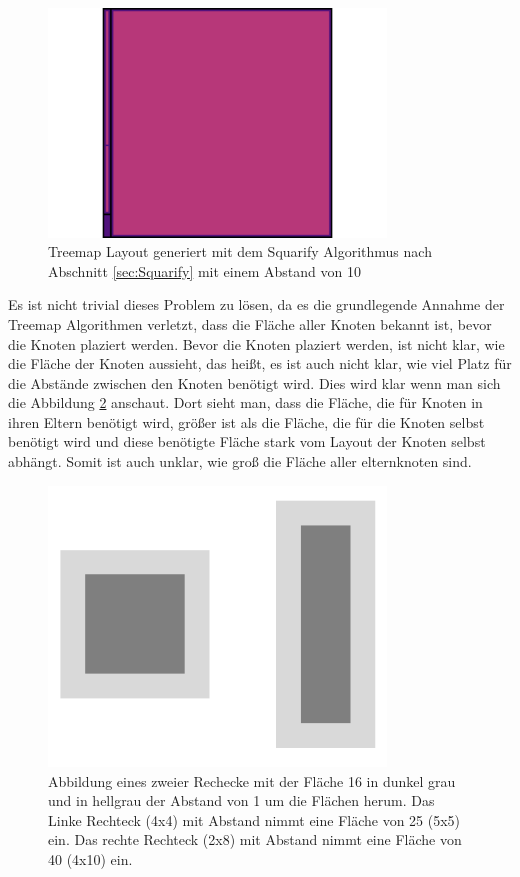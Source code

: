 \begin{figure}
    \centering
    \includegraphics[width=0.8\textwidth]{images/tenMarginArtifialMap.png}
    \caption{Treemap Layout generiert mit dem Squarify Algorithmus nach Abschnitt \ref{sec:Squarify} mit einem Abstand von 10} 
    \label{fig:tenMarginArtificialMap}
\end{figure}

Es ist nicht trivial dieses Problem zu lösen, da es die grundlegende Annahme der Treemap Algorithmen verletzt, dass die Fläche aller Knoten bekannt ist, bevor die Knoten plaziert werden. 
Bevor die Knoten plaziert werden, ist nicht klar, wie die Fläche der Knoten aussieht, das heißt, es ist auch nicht klar, wie viel Platz für die Abstände zwischen den Knoten benötigt wird. Dies wird klar wenn man sich die Abbildung \ref{fig:marginAreaDifference} anschaut. Dort sieht man, dass die Fläche, die für Knoten in ihren Eltern benötigt wird, größer ist als die Fläche, die für die Knoten selbst benötigt wird und diese benötigte Fläche stark vom Layout der Knoten selbst abhängt. Somit ist auch unklar, wie groß die Fläche aller elternknoten sind. 

\begin{figure}
    \centering
    \includegraphics[width=0.8\textwidth]{images/marginArea.png}
    \caption{Abbildung eines zweier Rechecke mit der Fläche 16 in dunkel grau und in hellgrau der Abstand von 1 um die Flächen herum. Das Linke Rechteck (4x4) mit Abstand nimmt eine Fläche von 25 (5x5) ein. Das rechte Rechteck (2x8) mit Abstand nimmt eine Fläche von 40 (4x10) ein.}
    \label{fig:marginAreaDifference}
\end{figure}

